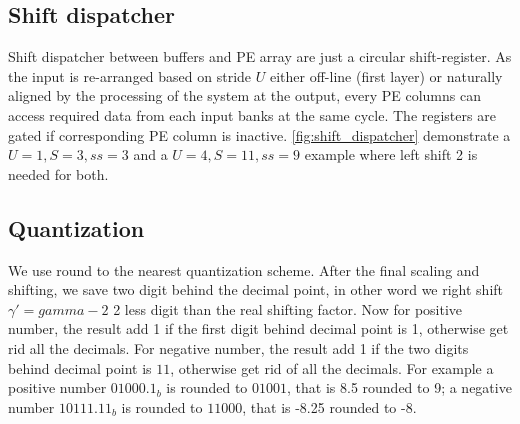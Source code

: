 \subsection{Shift dispatcher}
Shift dispatcher between buffers and PE array are just a circular shift-register. As the input is re-arranged based on stride $U$ either off-line (first layer) or naturally aligned by the processing of the system at the output, every PE columns can access required data from each input banks at the same cycle. The registers are gated if corresponding PE column is inactive. \autoref{fig:shift_dispatcher} demonstrate a $U=1,S=3,ss=3$ and a $U=4,S=11,ss=9$ example where left shift 2 is needed for both.  

\subsection{Quantization}
We use round to the nearest quantization scheme. After the final scaling and shifting, we save two digit behind the decimal point, in other word we right shift $\gamma'=gamma-2$ 2 less digit than the real shifting factor. Now for positive number, the result add 1 if the first digit behind decimal point is 1, otherwise get rid all the decimals. For negative number, the result add 1 if the two digits behind decimal point is $11$, otherwise get rid of all the decimals. For example a positive number $01000.1_b$ is rounded to $01001$, that is 8.5 rounded to 9; a negative number $10111.11_b$ is rounded to $11000$, that is -8.25 rounded to -8. 

